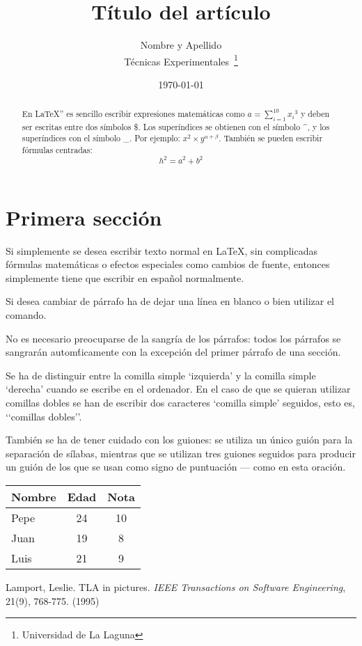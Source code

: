 \documentclass[a4paper,12pt]{article}
\begin{document}
 
\title{Título del artículo}
\author{Nombre y Apellido \\ 
        T\'ecnicas Experimentales~\footnote{Universidad de La Laguna}
        }
\date{\today}
\maketitle
\begin{abstract}
 En \LaTeX{}''\cite{Lam:86} es sencillo escribir expresiones
 matem\'aticas como $a=\sum_{i=1}^{10} {x_i}^{3}$
 y deben ser escritas entre dos s\'imbolos \$.
 Los superíndices se obtienen con el s\'imbolo \^{}, y
 los super\'indices con el s\'imbolo \_.
 Por ejemplo: $x^2 \times y ^{\alpha + \beta}$.
 Tambi\'en se pueden escribir f\'ormulas centradas:
 \[h^2=a^2 + b^2 \]
\end{abstract}

\section{Primera sección}
Si simplemente se desea escribir texto normal en LaTeX,
sin complicadas f\'ormulas matem\'aticas o efectos especiales
como cambios de fuente, entonces simplemente tiene que escribir
en espa\~nol normalmente.

Si desea cambiar de p\'arrafo ha de dejar una l\'inea en blanco o bien
utilizar el comando.\par

No es necesario preocuparse de la sangr\'ia de los p\'arrafos:
todos los p\'arrafos se sangrarán autom\'ticamente con la excepci\'on
del primer párrafo de una secci\'on.

Se ha de distinguir entre la comilla simple ‘izquierda’
y la comilla simple ‘derecha’ cuando se escribe en el ordenador.
En el caso de que se quieran utilizar comillas dobles se han de
escribir dos caracteres ‘comilla simple’ seguidos, esto es,
‘‘comillas dobles’’.\par

Tambi\'en se ha de tener cuidado con los guiones: se utiliza un \'unico
gui\'on para la separación de s\'ilabas, mientras que se utilizan
tres guiones seguidos para producir un guión de los que se usan
como signo de puntuaci\'on --- como en esta oración.

\bigskip
\begin{tabular}{|l|c|c|}
\hline
 Nombre & Edad & Nota \\ \hline
 Pepe   &   24 &   10 \\ \hline
 Juan   &   19 &    8 \\ \hline
 Luis   &   21 &    9   \\ \hline
\end{tabular}

\begin{thebibliography}{00}
 Lamport, Leslie.
 TLA in pictures.
 \emph{IEEE Transactions on Software Engineering},
 21(9), 768-775.
 (1995)
\end{thebibliography}
\end{document}
